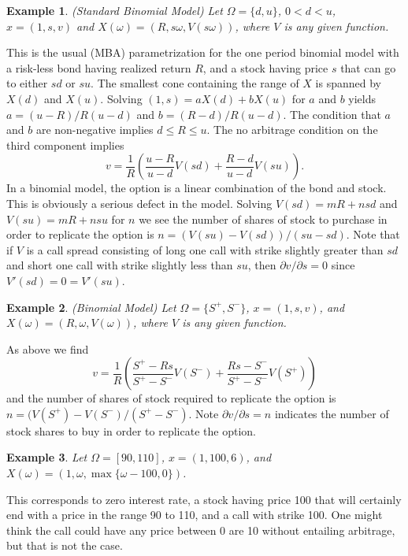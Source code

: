 \documentclass[fleqn]{amsart}
\newtheorem{example}{Example}
\begin{document}
\begin{example}{(Standard Binomial Model)}
Let $\Omega = \{d, u\}$, $0<d<u$, $x = (1, s, v)$
and $X(\omega) = (R, s\omega, V(s\omega))$, where $V$ is any given function.
\end{example}
This is the usual (MBA) parametrization for the one period binomial model with
a risk-less bond having realized return $R$, and a stock having price $s$
that can go to either $sd$ or $su$.  The smallest cone containing the
range of $X$ is spanned by $X(d)$ and $X(u)$.  Solving $(1, s) = aX(d)
+ bX(u)$ for $a$ and $b$ yields $a = (u - R)/R(u - d)$ and
$b = (R - d)/R(u - d)$.
The condition that $a$ and $b$ are non-negative implies $d
\le R \le u$. The no arbitrage condition on the third component implies
\begin{equation*}
  v = \frac{1}{R}\left(\frac{u - R}{u - d} V(sd)
    + \frac{R - d}{u - d} V(su)\right).
\end{equation*}
In a binomial model, the option is a linear combination of the bond
and stock. This is obviously a serious defect in the model.
Solving $V(sd) = mR + nsd$ and $V(su) = mR + nsu$ for $n$ we see
the number of shares of stock to purchase in order to replicate the option
is \(n = (V(su) - V(sd))/(su - sd)\). 
Note that if $V$ is a call spread consisting of long one call with strike
slightly greater than $sd$ and short one call with strike slightly less
than $su$, then $\partial v/\partial s = 0$ since $V'(sd) = 0 = V'(su)$.

\begin{example}{(Binomial Model)}
Let $\Omega = \{S^+, S^-\}$, $x = (1, s, v)$, and 
$X(\omega) = (R, \omega, V(\omega))$, where $V$ is any given function.
\end{example}
As above we find
\begin{equation*}
	v = \frac{1}{R}\left(\frac{S^+ - Rs}{S^+ - S^-} V(S^-) 
		+ \frac{Rs - S^-}{S^+ - S^-} V(S^+)\right)
\end{equation*}
and the number of shares of stock required to replicate the option is
$n = (V(S^+) - V(S^-)/(S^+ - S^-)$. Note $\partial v/\partial s = n$
indicates the number of stock shares to buy in order to replicate
the option.

\begin{example}
Let $\Omega = [90,110]$, $x = (1, 100, 6)$, 
and $X(\omega) = (1, \omega, \max\{\omega - 100, 0\})$.
\end{example}
This corresponds to
zero interest rate, a stock having price 100 that will certainly end with
a price in the range 90 to 110, and a call with strike 100. One might
think the call could have any price between 0 are 10 without entailing
arbitrage, but that is not the case.
\end{document}
